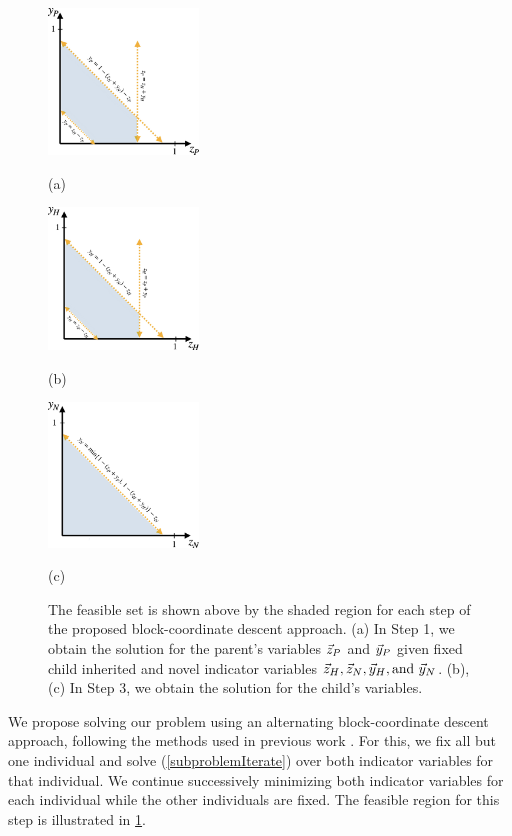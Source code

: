 	\begin{figure}[htb]
	\begin{minipage}[h]{0.30\linewidth}
		\centering
		\centerline{\includegraphics[width=4.0cm]{figs/parent_region.png}}
		\centerline{(a)}\medskip
	\end{minipage}
	\begin{minipage}[h]{.30\linewidth}
		\centering
		\centerline{\includegraphics[width=4.0cm]{figs/inherited_region.png}}
		\centerline{(b)}\medskip
	\end{minipage}
	\begin{minipage}[h]{0.30\linewidth}
		\centering
		\centerline{\includegraphics[width=4.0cm]{figs/novel_region.png}}
		\centerline{(c) }\medskip
	\end{minipage}
	\caption{The feasible set is shown above by the shaded region for each step of the proposed block-coordinate descent approach. (a) In Step 1, we obtain the solution for the parent's variables $\vec{z}_P$ and $\vec{y}_P$ given fixed child inherited and novel indicator variables $\vec{z}_H, \vec{z}_N, \vec{y}_H, \text{and } \vec{y}_N$. (b), (c) In Step 3, we obtain the solution for the child's variables.  }
	\label{fig:regions}
\end{figure}
We propose solving our problem using an alternating block-coordinate descent approach, following the methods used in previous work \cite{MB_diploidTrios, lazar_2021,MB_SingleParentDiploid}. For this,  we fix all but one individual and solve (\ref{subproblemIterate}) over both indicator variables for that individual. We continue successively minimizing both indicator variables for each individual while the other individuals are fixed. The feasible region for this step is illustrated in \ref{fig:regions}.\\


